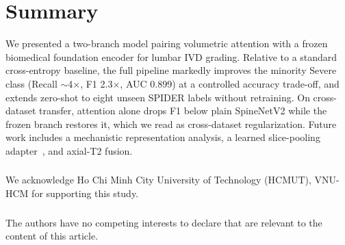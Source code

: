 \documentclass[runningheads]{llncs}
\begin{document}
\section{Summary}\label{sec5}

We presented a two-branch model pairing volumetric attention with a frozen biomedical foundation encoder for lumbar IVD grading. Relative to a standard cross-entropy baseline, the full pipeline markedly improves the minority Severe class (Recall $\sim$4$\times$, F1 2.3$\times$, AUC 0.899) at a controlled accuracy trade-off, and extends zero-shot to eight unseen SPIDER labels without retraining. On cross-dataset transfer, attention alone drops F1 below plain SpineNetV2 while the frozen branch restores it, which we read as cross-dataset regularization. Future work includes a mechanistic representation analysis, a learned slice-pooling adapter~\cite{lu2024radclip}, and axial-T2 fusion.

\begin{credits}
\subsubsection{\ackname} We acknowledge Ho Chi Minh City University of Technology (HCMUT), VNU-HCM for supporting this study.
\subsubsection{\discintname} The authors have no competing interests to declare that are relevant to the content of this article.
\end{credits}
%


\end{document}
